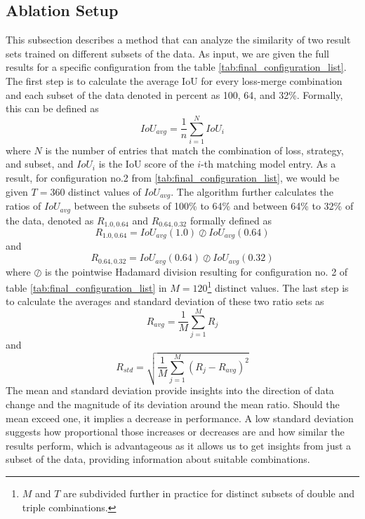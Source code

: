 \subsection{Ablation Setup}
\label{subsec:ablation_setup}
This subsection describes a method that can analyze the similarity of two result sets trained on different subsets of the data. As input, we are given the full results for a specific configuration from the table \ref{tab:final_configuration_list}. The first step is to calculate the average \ac{IoU} for every loss-merge combination and each subset of the data denoted in percent as 100, 64, and 32\%. Formally, this can be defined as
\begin{equation}
  IoU_{avg}=\frac{1}{n}\sum_{i=1}^N IoU_i
\end{equation}
where $N$ is the number of entries that match the combination of loss, strategy, and subset, and $IoU_{i}$ is the \ac{IoU} score of the $i$-th matching model entry. As a result, for configuration no.2 from \ref{tab:final_configuration_list}, we would be given $T=360$ distinct values of $IoU_{avg}$. The algorithm further calculates the ratios of $IoU_{avg}$ between the subsets of 100\% to 64\% and between 64\% to 32\% of the data, denoted as $R_{1.0,0.64}$ and $R_{0.64,0.32}$ formally defined as
\begin{equation}
  R_{1.0,0.64}=IoU_{avg}(1.0) \oslash IoU_{avg}(0.64)
\end{equation}
and
\begin{equation}
  R_{0.64,0.32}=IoU_{avg}(0.64) \oslash IoU_{avg}(0.32)
\end{equation}
where $\oslash$ is the pointwise Hadamard division \cite{wetzstein2012tensor} resulting for configuration no. 2 of table \ref{tab:final_configuration_list} in $M=120$\footnote{$M$ and $T$ are subdivided further in practice for distinct subsets of double and triple combinations.} distinct values. The last step is to calculate the averages and standard deviation of these two ratio sets as
\begin{equation}
  R_{avg}=\frac{1}{M}\sum_{j=1}^M R_j
  \label{eqn:ratio_average_ablation}
\end{equation}
and
\begin{equation}
  R_{std}=\sqrt{\frac{1}{M}\sum_{j=1}^M(R_j-R_{avg})^2}
\end{equation}
The mean and standard deviation provide insights into the direction of data change and the magnitude of its deviation around the mean ratio. Should the mean exceed one, it implies a decrease in performance. A low standard deviation suggests how proportional those increases or decreases are and how similar the results perform, which is advantageous as it allows us to get insights from just a subset of the data, providing information about suitable combinations.

